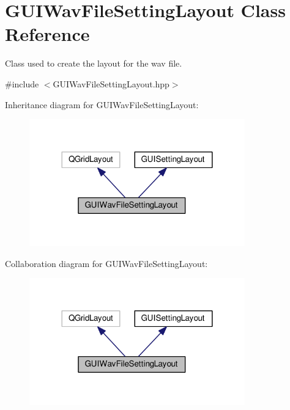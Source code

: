\hypertarget{class_g_u_i_wav_file_setting_layout}{}\section{G\+U\+I\+Wav\+File\+Setting\+Layout Class Reference}
\label{class_g_u_i_wav_file_setting_layout}


Class used to create the layout for the wav file.  




{\ttfamily \#include $<$G\+U\+I\+Wav\+File\+Setting\+Layout.\+hpp$>$}



Inheritance diagram for G\+U\+I\+Wav\+File\+Setting\+Layout\+:
\nopagebreak
\begin{figure}[H]
\begin{center}
\leavevmode
\includegraphics[width=264pt]{class_g_u_i_wav_file_setting_layout__inherit__graph}
\end{center}
\end{figure}


Collaboration diagram for G\+U\+I\+Wav\+File\+Setting\+Layout\+:
\nopagebreak
\begin{figure}[H]
\begin{center}
\leavevmode
\includegraphics[width=264pt]{class_g_u_i_wav_file_setting_layout__coll__graph}
\end{center}
\end{figure}
